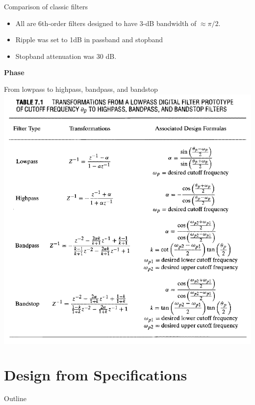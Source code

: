 \documentclass[10pt, handout]{beamer}
\begin{document}
%
\begin{frame}{Comparison of classic filters}
	\begin{itemize}
		\item All are 6th-order filters designed to have 3-dB bandwidth of $\approx \pi/2$.
		\item Ripple was set to 1dB in passband and stopband
		\item Stopband attenuation was 30 dB.
	\end{itemize}
	
	\textbf{Phase}
	\begin{center}
		\resizebox{0.7\linewidth}{!}{}
	\end{center}
	
\end{frame}

%
\begin{frame}{From lowpass to highpass, bandpass, and bandstop}
\centering
\includegraphics[scale=0.6]{figs/filter_transformation.png}
\end{frame}

\section{Design from Specifications}
\begin{frame}{Outline}
	\tableofcontents[currentsection]
\end{frame}
\end{document}
